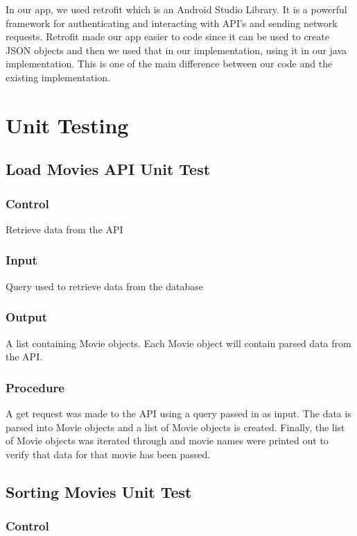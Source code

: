 \documentclass[12pt, titlepage]{article}
\begin{document}
In our app, we used retrofit which is an Android Studio Library. It is a powerful framework for authenticating and interacting with API's and sending network requests. Retrofit made our app easier to code since it can be used to create JSON objects and then we used that in our implementation, using it in our java implementation. This is one of the main difference between our code and the existing implementation. 

\section{Unit Testing}
\subsection{Load Movies API Unit Test}
\subsubsection{Control}

Retrieve data from the API

\subsubsection{Input}

Query used to retrieve data from the database 

\subsubsection{Output}

A list containing Movie objects. Each Movie object will contain parsed data from the API. 

\subsubsection{Procedure}

A get request was made to the API using a query passed in as input. The data is parsed into Movie objects 
and a list of Movie objects is created. Finally, the list of Movie objects was iterated through and movie names were printed out to verify that data for that movie has been passed. 

\subsection{Sorting Movies Unit Test}
\subsubsection{Control}
\end{document}
